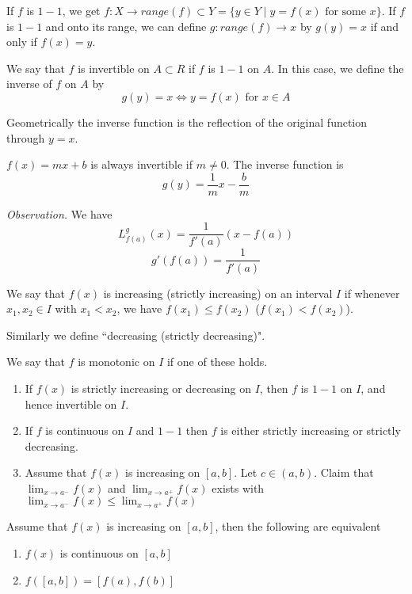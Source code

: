 

\begin{note}
If $f$ is $1-1$, we get $f\colon X\to range(f) \subset Y = \{y\in Y \mid y = f(x) \text{ for some }x\}$. If $f$ is $1-1$ and onto its range, we can define $g\colon range(f) \to x$ by $g(y) = x$ if and only if $f(x) =y$.
\end{note}

\begin{defn}
We say that $f$ is invertible on $A\subset R$ if $f$ is $1-1$ on $A$. In this case, we define the inverse of $f$ on $A$ by \[g(y) = x \iff y = f(x)\text{ for }x\in A\]
\end{defn}

\begin{note}
Geometrically the inverse function is the reflection of the original function through $y=x$.
\end{note}

\begin{exmp}
$f(x) = mx + b$ is always invertible if $m\neq 0$. The inverse function is \[g(y) = \frac{1}{m}x -\frac{b}{m}\]
\end{exmp}

\textit{Observation.} We have \[L_{f(a)}^g (x) = \frac{1}{f'(a)}(x-f(a))\] \[g'(f(a)) = \frac{1}{f'(a)}\]

\begin{defn}
We say that $f(x)$ is increasing (strictly increasing) on an interval $I$ if whenever $x_1,x_2 \in I$ with $x_1<x_2$, we have $f(x_1) \leq f(x_2)$ ($f(x_1) < f(x_2)$).

Similarly we define ``decreasing (strictly decreasing)".

We say that $f$ is monotonic on $I$ if one of these holds.
\end{defn}

\begin{enumerate}
    \item If $f(x)$ is strictly increasing or decreasing on $I$, then $f$ is $1-1$ on $I$, and hence invertible on $I$.
    \item If $f$ is continuous on $I$ and $1-1$ then $f$ is either strictly increasing or strictly decreasing.
    \item Assume that $f(x)$ is increasing on $[a,b]$. Let $c\in (a,b)$. Claim that $\lim_{x\to a^-} f(x)$ and $\lim_{x\to a^+} f(x)$ exists with $\lim_{x\to a^-} f(x) \leq \lim_{x\to a^+} f(x)$
\end{enumerate}

\begin{thm}
Assume that $f(x)$ is increasing on $[a,b]$, then the following are equivalent
\begin{enumerate}
\item $f(x)$ is continuous on $[a,b]$
\item $f([a,b]) = [f(a),f(b)]$
\end{enumerate}
\end{thm}